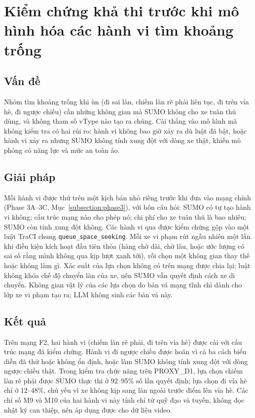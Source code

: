 \documentclass[../DoAn.tex]{subfiles}
\begin{document}
\section{Kiểm chứng khả thi trước khi mô hình hóa các hành vi tìm khoảng trống}
\label{section:5.6}

\subsection{Vấn đề}

Nhóm tìm khoảng trống khi ùn (đi sai làn, chiếm làn rẽ phải liên tục, đi trên vỉa hè, đi ngược chiều) cần những không gian mà SUMO không cho xe tuân thủ dùng, và không tham số vType nào tạo ra chúng. Cài thẳng vào mô hình mà không kiểm tra có hai rủi ro: hành vi không bao giờ xảy ra dù luật đã bật, hoặc hành vi xảy ra nhưng SUMO không tính xung đột với dòng xe thật, khiến mô phỏng có năng lực và mức an toàn ảo.

\subsection{Giải pháp}

Mỗi hành vi được thử trên một kịch bản nhỏ riêng trước khi đưa vào mạng chính (Phase 3A--3C, Mục~\ref{subsection:phase3}), với bốn câu hỏi: SUMO có tự tạo hành vi không; cấu trúc mạng nào cho phép nó; chi phí cho xe tuân thủ là bao nhiêu; SUMO còn tính xung đột không. Các hành vi qua được kiểm chứng gộp vào một luật TraCI chung \texttt{queue\_space\_seeking}. Mỗi xe vi phạm rút ngẫu nhiên một lần khi điều kiện kích hoạt đầu tiên thỏa (hàng chờ dài, chờ lâu, hoặc ước lượng có sai số rằng mình không qua kịp lượt xanh tới), rồi chọn một không gian thay thế hoặc không làm gì. Xác suất của lựa chọn không có trên mạng được chia lại; luật không khóa chế độ chuyển làn của xe, nên SUMO vẫn quyết định cách xe di chuyển. Không gian vật lý của các lựa chọn do bản vá mạng tĩnh chỉ dành cho lớp xe vi phạm tạo ra; LLM không sinh các bản vá này.

\subsection{Kết quả}

Trên mạng F2, hai hành vi (chiếm làn rẽ phải, đi trên vỉa hè) được cài với cấu trúc mạng đã kiểm chứng. Hành vi đi ngược chiều được hoãn vì cả ba cách biểu diễn đã thử hoặc không ổn định, hoặc làm SUMO không tính xung đột với dòng ngược chiều thật. Trong kiểm tra chức năng trên PROXY\_D1, lựa chọn chiếm làn rẽ phải được SUMO thực thi ở 92--95\% số lần quyết định; lựa chọn đi vỉa hè chỉ ở 12--48\%, chủ yếu vì xe không kịp sang làn ngoài trước điểm lên vỉa hè. Các chỉ số M9 và M10 của hai hành vi này tính chỉ từ quỹ đạo và tuyến, không đọc nhật ký can thiệp, nên áp dụng được cho dữ liệu video.
\end{document}
